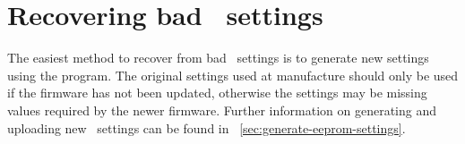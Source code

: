 
\section[Recovering bad EEPROM settings]{%
  Recovering bad \eeprom\ settings}
\label{sec:bad-eeprom-settings}

The easiest method to recover from bad \eeprom\ settings is to
generate new settings using the 
program. The original settings used at manufacture should only be used
if the firmware has not been updated, otherwise the settings may be
missing values required by the newer firmware. Further information on
generating and uploading new \eeprom\ settings can be found in
\secname~\ref{sec:generate-eeprom-settings}.

